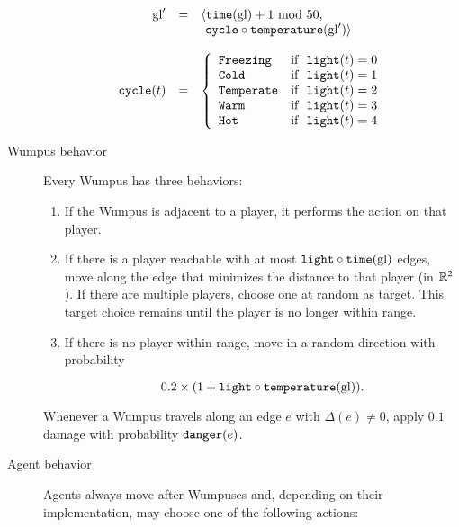 \begin{definition}
\begin{description}
	$$
		\begin{array}{r c l}
			\mathrm{gl}' & = & \langle \mathtt{time}(\mathrm{gl}) + 1\ \mathrm{mod}\ 50,\\
					   &   &       \ \mathtt{cycle} \circ \mathtt{temperature}(\mathrm{gl}') \rangle\\
			\\
			\mathtt{cycle}(t) & = &
			\left\{
				\begin{array}{l l}
					\mathtt{Freezing} & \textnormal{if }\ \mathtt{light}(t) = 0\\
					\mathtt{Cold} & \textnormal{if }\ \mathtt{light}(t) = 1\\
					\mathtt{Temperate} & \textnormal{if }\ \mathtt{light}(t) = 2\\
					\mathtt{Warm} & \textnormal{if }\ \mathtt{light}(t) = 3\\
					\mathtt{Hot} & \textnormal{if }\ \mathtt{light}(t) = 4
				\end{array}
			\right.\\
		\end{array}
	$$
	
	\item[Wumpus behavior] Every Wumpus has three behaviors:
	
	\begin{enumerate}
		\item If the Wumpus is adjacent to a player, it performs the  action on that player.
		
		\item If there is a player reachable with at most $\mathtt{light} \circ \mathtt{time} (\mathrm{gl})$ edges, move along the edge that minimizes the distance to that player (in $\mathbb{R}^2$). If there are multiple players, choose one at random as target. This target choice remains until the player is no longer within range.
		
		\item If there is no player within range, move in a random direction with probability
		
		$$
			0.2 \times (1 + \mathtt{light} \circ \mathtt{temperature} (\mathrm{gl})).
		$$
	\end{enumerate}
	
	Whenever a Wumpus travels along an edge $e$ with $\Delta(e) \neq 0$, apply $0.1$ damage with probability $\mathtt{danger}(e)$.
	
	\item[Agent behavior] Agents always move after Wumpuses and, depending on their implementation, may choose one of the following actions:
	

\end{description}
\end{definition}
